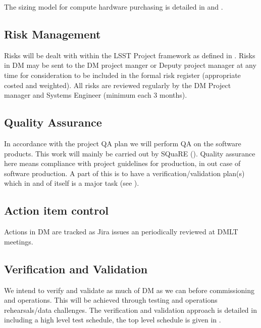The sizing model for compute hardware purchasing is detailed in   and .

\subsection {Risk Management } \label{sect:risk}

Risks will be dealt with within the LSST Project framework as defined in .
Risks in DM may be sent to the DM project manger or Deputy project manager at any time for consideration to be included in the formal risk register (appropriate costed and weighted). All risks are reviewed regularly by the DM Project manager and Systems Engineer (minimum each 3 months).


\subsection {Quality Assurance  } \label{sect:pa}

In accordance with the project QA plan  we will perform QA on the software products.
This work will mainly be carried out by SQuaRE ().
Quality assurance here means compliance with project guidelines for production, in out case of software production.
A part of this is to have a verification/validation plan(s) which in and of itself is a major task (see ).


\subsection{Action item control}
Actions in DM are tracked as Jira issues an periodically reviewed at DMLT meetings.


\subsection {Verification and Validation } \label{sect:vanv}

We intend to verify and validate as much of DM as we can before commissioning and operations.
This will be achieved through testing and operations rehearsals/data challenges.
The verification and validation approach is detailed in  including a high level test schedule,
the top level schedule is given in .
